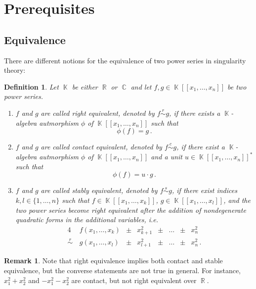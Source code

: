\documentclass[noend]{amsproc}
\newtheorem{defn}[theorem]{Definition}
\theoremstyle{definition}
\newtheorem{remark}[theorem]{Remark}
\newcommand{\requiv}{\ensuremath{\mathrel{\overset{r}{\sim}}}}
\newcommand{\cequiv}{\ensuremath{\mathrel{\overset{c}{\sim}}}}
\newcommand{\sequiv}{\ensuremath{\mathrel{\overset{s}{\sim}}}}
\DeclareMathOperator{\R}{\mathbb{R}}
\DeclareMathOperator{\C}{\mathbb{C}}
\DeclareMathOperator{\K}{\mathbb{K}}
\begin{document}
\section{Prerequisites}%
\label{sec:prerequisites}

\subsection{Equivalence}%
\label{subsec:equivalence}

There are different notions for the equivalence of two power series in
singularity theory:

\begin{defn}%
\label{def:equivalence}
Let $\K$ be either $\R$ or $\C$ and let $f, g \in \K[[x_1, \ldots, x_n]]$ be
two power series.

\begin{enumerate}
\item
$f$ and $g$ are called \emph{right equivalent}, denoted by $f \requiv g$, if
there exists a $\K$-algebra autmorphism $\phi$ of $\K[[x_1, \ldots, x_n]]$ such
that
\[
\phi(f) = g \,.
\]

\item
$f$ and $g$ are called \emph{contact equivalent}, denoted by $f \cequiv g$, if
there exist a $\K$-algebra autmorphism $\phi$ of $\K[[x_1, \ldots, x_n]]$ and a
unit $u \in \K[[x_1, \ldots, x_n]]^*$ such that
\[
\phi(f) = u \cdot g \,.
\]

\item\label{enum:stable_equivalence}
$f$ and $g$ are called \emph{stably equivalent}, denoted by $f \sequiv g$, if
there exist indices $k, l \in \{1, \ldots ,n\}$ such that
$f \in \K[[x_1, \ldots, x_k]]$, $g \in \K[[x_1, \ldots, x_l]]$, and the two
power series become right equivalent after the addition of nondegenerate
quadratic forms in the additional variables, i.e.
\begin{alignat*}{4}
& f(x_1, \ldots, x_k) &{}\pm{}& x_{k+1}^2 &{}\pm{}& \ldots &{}\pm{}& x_n^2 \\
\requiv{} \,
& g(x_1, \ldots, x_l) &{}\pm{}& x_{l+1}^2 &{}\pm{}& \ldots &{}\pm{}& x_n^2 \,.
\end{alignat*}
\end{enumerate}
\end{defn}

\begin{remark}
Note that right equivalence implies both contact and stable equivalence, but
the converse statements are not true in general. For instance, $x_1^2+x_2^2$
and $-x_1^2-x_2^2$ are contact, but not right equivalent over $\R$.
\end{remark}
\end{document}

